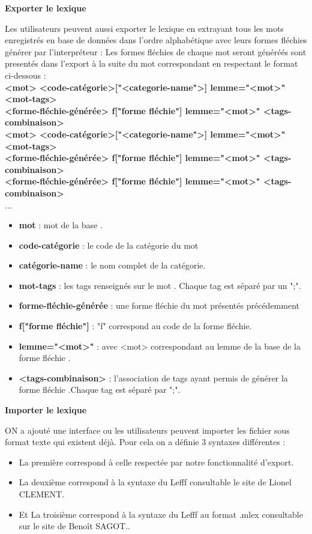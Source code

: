 \documentclass[12pt,a4paper]{article}
\begin{document}
 
   \textbf{Exporter le lexique}

Les utilisateurs peuvent aussi exporter le lexique en extrayant tous les mots enregistrés en base de données dans l'ordre alphabétique avec leurs formes fléchies générer par l'interpréteur :
Les formes fléchies de chaque mot seront généréés sont presentés dans l'export à la suite du mot correspondant en respectant le format ci-dessous :\\
\textbf{<mot> <code-catégorie>["<categorie-name">] lemme="<mot>" {<mot-tags>}} \\
\textbf{<forme-fléchie-générée>  f["forme fléchie"] lemme="<mot>" {<tags-combinaison>}}\\
\textbf{<mot> <code-catégorie>["<categorie-name">] lemme="<mot>" {<mot-tags>}} \\
\textbf{<forme-fléchie-générée>  f["forme fléchie"] lemme="<mot>" {<tags-combinaison>}}\\
\textbf{<forme-fléchie-générée>  f["forme fléchie"] lemme="<mot>" {<tags-combinaison>}}\\
...

\begin{itemize}  
\item \textbf{mot} : mot de la base .
\item \textbf{code-catégorie} : le code de la catégorie du mot 
\item \textbf{catégorie-name} : le nom complet de la catégorie.
\item \textbf{mot-tags} : les tags renseignés sur le mot . Chaque tag est séparé par un ";".
\item \textbf{forme-fléchie-générée} : une forme fléchie du mot présentés précédemment
\item \textbf{f["forme fléchie"]} : "f" correspond au code de la forme fléchie. 
\item \textbf{lemme="<mot>"} : avec <mot> correspondant au lemme de la base de la forme fléchie .
\item \textbf{<tags-combinaison>} : l'association de tags ayant permis de générer la forme fléchie .Chaque tag est séparé par ";".
\end{itemize}

 
  \textbf{ Importer le lexique}

ON a ajouté une interface ou les utilisateurs peuvent importer les fichier sous format texte qui existent déjà. Pour cela on a définie 3 syntaxes différentes : 
\begin{itemize}

  \item La  première correspond à celle respectée par notre fonctionnalité d'export.
  \item La deuxième  correspond à la syntaxe du Lefff consultable le site de Lionel CLEMENT.
  \item Et La troisième  correspond à la syntaxe du Lefff au format .mlex consultable sur le site de Benoît SAGOT..
\end{itemize}
\end{document}

